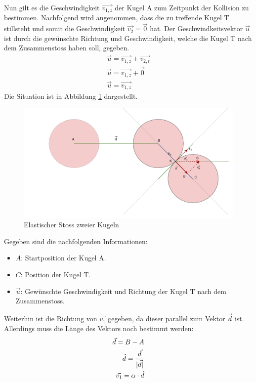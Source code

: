 Nun gilt es die Geschwindigkeit $\vec{v_{1,z}}$ der Kugel A zum Zeitpunkt der Kollision zu bestimmen.
Nachfolgend wird angenommen, dass die zu treffende Kugel T stillsteht und somit die Geschwindigkeit $\vec{v_2} = \vec{0}$ hat.
Der Geschwindkeitsvektor $\vec{u}$ ist durch die gewünschte Richtung und Geschwindigkeit,
welche die Kugel T nach dem Zusammenstoss haben soll, gegeben.
\begin{align}
    \vec{u} = \vec{v_{1,z}} + \vec{v_{2,t}}\\
    \vec{u} = \vec{v_{1,z}} + \vec{0}\\
    \vec{u} = \vec{v_{1,z}}
\end{align}
Die Situation ist in Abbildung \ref{fig:elasticCollisionOfTwoBalls} dargestellt.

\begin{figure}[h!]
    \begin{center}
        \includegraphics[width=0.6\linewidth]{../common/03_billiard_ai/resources/22_kollision_rueckwaerts.png}
    \end{center}
    \caption{Elastischer Stoss zweier Kugeln}
    \label{fig:elasticCollisionOfTwoBalls}
\end{figure}

Gegeben sind die nachfolgenden Informationen:
\begin{itemize}
    \item $A$: Startposition der Kugel A.
    \item $C$: Position der Kugel T.
    \item $\vec{u}$: Gewünschte Geschwindigkeit und Richtung der Kugel T nach dem Zusammenstoss.
\end{itemize}

Weiterhin ist die Richtung von $\vec{v_1}$ gegeben, da dieser parallel zum Vektor $\vec{d}$ ist.
Allerdings muss die Länge des Vektors noch bestimmt werden:
\begin{align}
    \vec{d} = B - A\\
    \hat{d} = \frac{\vec{d}}{\lvert \vec{d} \rvert}\\
    \vec{v_1} = \alpha \cdot \hat{d}
\end{align}

